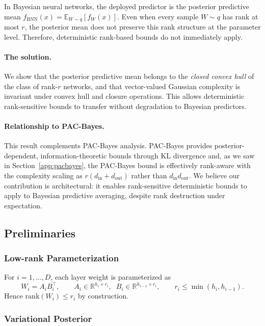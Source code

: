 \documentclass{article}
\theoremstyle{plain}
\theoremstyle{definition}
\theoremstyle{remark}
\begin{document}
In Bayesian neural networks, the deployed predictor is the posterior predictive mean $f_{\text{BNN}}(x) = \mathbb{E}_{W \sim q}[f_W(x)]$. Even when every sample $W \sim q$ has rank at most $r$, the posterior mean does not preserve this rank structure at the parameter level. Therefore, deterministic rank-based bounds do not immediately apply.

\paragraph{The solution.} We show that the posterior predictive mean belongs to the \emph{closed convex hull} of the class of rank-$r$ networks, and that vector-valued Gaussian complexity is invariant under convex hull and closure operations. This allows deterministic rank-sensitive bounds to transfer without degradation to Bayesian predictors.

 \paragraph{Relationship to PAC-Bayes.} This result complements PAC-Bayes analysis. PAC-Bayes provides posterior-dependent, information-theoretic bounds through KL divergence and, as we saw in Section~\ref{app:pacbayes}, the PAC-Bayes bound is effectively rank-aware with the complexity scaling as $r(d_{\text{in}} + d_{\text{out}})$ rather than $d_{\text{in}}d_{\text{out}}$. We believe our contribution is architectural: it enables rank-sensitive deterministic bounds to apply to Bayesian predictive averaging, despite rank destruction under expectation.

\subsection{Preliminaries}\label{app:gaussian_complexity:prelim}

\subsubsection{Low-rank Parameterization}

For $i=1,\ldots,D$, each layer weight is parameterized as
\[
W_i = A_i B_i^\top,
\qquad
A_i\in\mathbb{R}^{h_i\times r_i},\;\;
B_i\in\mathbb{R}^{h_{i-1}\times r_i},
\qquad
r_i\le \min(h_i,h_{i-1}).
\]
Hence $\mathrm{rank}(W_i)\le r_i$ by construction.

\subsubsection{Variational Posterior}
\end{document}
